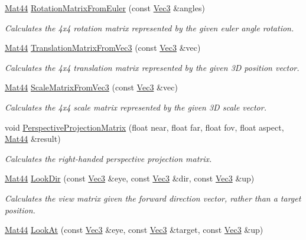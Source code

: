 \begin{DoxyCompactItemize}
\hyperlink{classgfxmath_1_1_mat44}{Mat44} \hyperlink{namespacegfxmath_a206e53fa5ea77b54765946af3d04ca0e}{Rotation\+Matrix\+From\+Euler} (const \hyperlink{classgfxmath_1_1_vec3}{Vec3} \&angles)
\begin{DoxyCompactList}\small\item\em Calculates the 4x4 rotation matrix represented by the given euler angle rotation. \end{DoxyCompactList}\item 
\hyperlink{classgfxmath_1_1_mat44}{Mat44} \hyperlink{namespacegfxmath_a2d82d58bdc14d1f1644b05a7419ea05e}{Translation\+Matrix\+From\+Vec3} (const \hyperlink{classgfxmath_1_1_vec3}{Vec3} \&vec)
\begin{DoxyCompactList}\small\item\em Calculates the 4x4 translation matrix represented by the given 3\+D position vector. \end{DoxyCompactList}\item 
\hyperlink{classgfxmath_1_1_mat44}{Mat44} \hyperlink{namespacegfxmath_a8ec877a1635b6a682a15195b47e1f21d}{Scale\+Matrix\+From\+Vec3} (const \hyperlink{classgfxmath_1_1_vec3}{Vec3} \&vec)
\begin{DoxyCompactList}\small\item\em Calculates the 4x4 scale matrix represented by the given 3\+D scale vector. \end{DoxyCompactList}\item 
void \hyperlink{namespacegfxmath_a8aa599fb24b0a8ce16acf8092ee29478}{Perspective\+Projection\+Matrix} (float near, float far, float fov, float aspect, \hyperlink{classgfxmath_1_1_mat44}{Mat44} \&result)
\begin{DoxyCompactList}\small\item\em Calculates the right-\/handed perspective projection matrix. \end{DoxyCompactList}\item 
\hyperlink{classgfxmath_1_1_mat44}{Mat44} \hyperlink{namespacegfxmath_a1d0cf66e3877d2be1e104bbacec0c917}{Look\+Dir} (const \hyperlink{classgfxmath_1_1_vec3}{Vec3} \&eye, const \hyperlink{classgfxmath_1_1_vec3}{Vec3} \&dir, const \hyperlink{classgfxmath_1_1_vec3}{Vec3} \&up)
\begin{DoxyCompactList}\small\item\em Calculates the view matrix given the forward direction vector, rather than a target position. \end{DoxyCompactList}\item 
\hyperlink{classgfxmath_1_1_mat44}{Mat44} \hyperlink{namespacegfxmath_ac420c9cd578ebe0b21c9db7757bc4c2d}{Look\+At} (const \hyperlink{classgfxmath_1_1_vec3}{Vec3} \&eye, const \hyperlink{classgfxmath_1_1_vec3}{Vec3} \&target, const \hyperlink{classgfxmath_1_1_vec3}{Vec3} \&up)

\end{DoxyCompactItemize}
